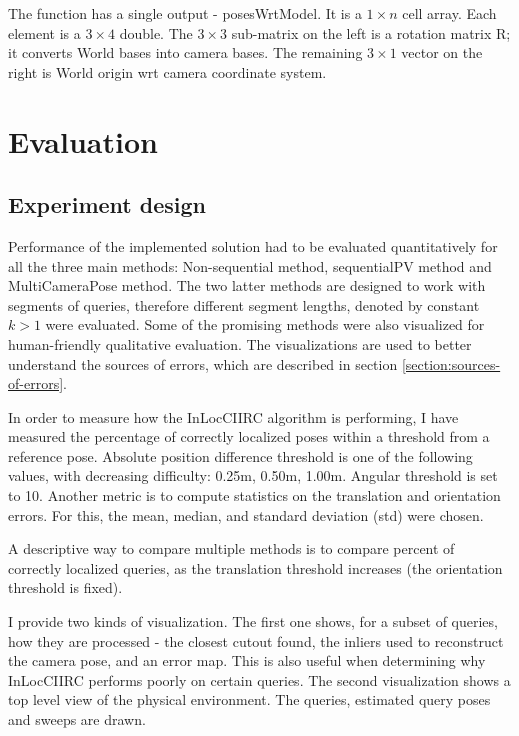 \documentclass[twoside]{ctuthesis}
\theoremstyle{plain}
\theoremstyle{definition}
\theoremstyle{note}
\begin{document}
The function has a single output - posesWrtModel. It is a $1 \times n$ cell array. Each element is a $3 \times 4$ double. The $3 \times 3$ sub-matrix on the left is a rotation matrix R; it converts World bases into camera bases. The remaining $3 \times 1$ vector on the right is World origin wrt camera coordinate system.

\chapter{Evaluation}
\label{chapter:evaluation}

\section{Experiment design}
Performance of the implemented solution had to be evaluated quantitatively for all the three main methods: Non-sequential method, sequentialPV method and MultiCameraPose method. The two latter methods are designed to work with segments of queries, therefore different segment lengths, denoted by constant $k>1$ were evaluated. Some of the promising methods were also visualized for human-friendly qualitative evaluation. The visualizations are used to better understand the sources of errors, which are described in section \ref{section:sources-of-errors}.

In order to measure how the InLocCIIRC algorithm is performing, I have measured the percentage of correctly localized poses within a threshold from a reference pose. Absolute position difference threshold is one of the following values, with decreasing difficulty: 0.25m, 0.50m, 1.00m. Angular threshold is set to 10\degree. Another metric is to compute statistics on the translation and orientation errors. For this, the mean, median, and standard deviation (std) were chosen.

A descriptive way to compare multiple methods is to compare percent of correctly localized queries, as the translation threshold increases (the orientation threshold is fixed).

I provide two kinds of visualization. The first one shows, for a subset of queries, how they are processed - the closest cutout found, the inliers used to reconstruct the camera pose, and an error map. This is also useful when determining why InLocCIIRC performs poorly on certain queries. The second visualization shows a top level view of the physical environment. The queries, estimated query poses and sweeps are drawn.
\end{document}

